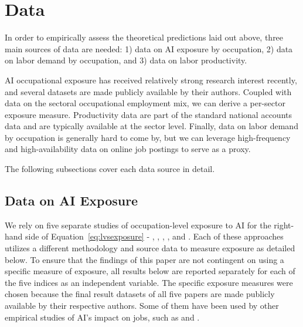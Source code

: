 \documentclass[11pt]{article}
\begin{document}

\section{Data}
\label{sec:data}
In order to empirically assess the theoretical predictions laid out above, three main sources of data are needed: 1) data on AI exposure by occupation, 2) data on labor demand by occupation, and 3) data on labor productivity.

AI occupational exposure has received relatively strong research interest recently, and several datasets are made publicly available by their authors. Coupled with data on the sectoral occupational employment mix, we can derive a per-sector exposure measure. Productivity data are part of the standard national accounts data and are typically available at the sector level. Finally, data on labor demand by occupation is generally hard to come by, but we can leverage high-frequency and high-availability data on online job postings to serve as a proxy.

The following subsections cover each data source in detail.

\subsection{Data on AI Exposure}

We rely on five separate studies of occupation-level exposure to AI for the right-hand side of Equation~\ref{eq:lvsexposure} - \cite{felten_method_2018}, \cite{webb_impact_2022}, \cite{eloundou_gpts_2023}, \cite{demirev2024assessing}, and \cite{handa2025economic}. Each of these approaches utilizes a different methodology and source data to measure exposure as detailed below. To ensure that the findings of this paper are not contingent on using a specific measure of exposure, all results below are reported separately for each of the five indices as an independent variable. The specific exposure measures were chosen because the final result datasets of all five papers are made publicly available by their respective authors. Some of them have been used by other empirical studies of AI's impact on jobs, such as \citet{albanesi2023newshares} and \citet{acemoglu2024simple}.
\end{document}
